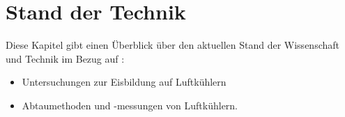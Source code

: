 \chapter{Stand der Technik}
\label{cha:Stand der Technik}

Diese Kapitel gibt einen Überblick über den aktuellen Stand der Wissenschaft und Technik im Bezug auf :
\begin{itemize}
\item Untersuchungen zur Eisbildung auf Luftkühlern
\item Abtaumethoden und -messungen von Luftkühlern.
\end{itemize}

